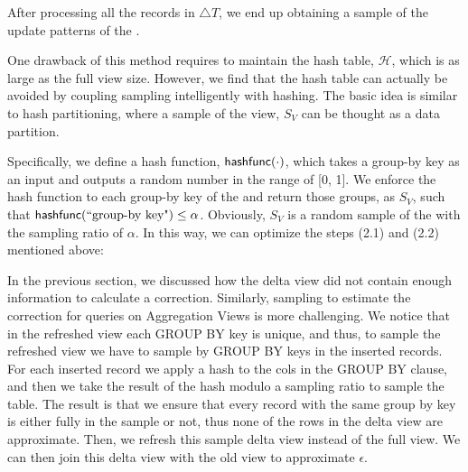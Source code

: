 After processing all the records in $\triangle T$, we end up obtaining a sample of the update patterns of the \aggview. 


One drawback of this method requires to maintain the hash table, $\mathcal{H}$, which is as large as the full view size. However, we find that the hash table can actually be avoided by coupling sampling intelligently with hashing. The basic idea is similar to hash partitioning, where a sample of the view, $S_{V}$ can be thought as a data partition. 

Specifically, we define a hash function, $\textsf{hashfunc}(\cdot)$, which takes a group-by key as an input and outputs a random number in the range of [0, 1]. We enforce the hash function to each group-by key of the \aggview and return those groups, as $S_{V}$, such that $\textsf{hashfunc}(\textrm{``group-by key"}) \leq \alpha$. Obviously, $S_{V}$ is a random sample of the \aggview with the sampling ratio of $\alpha$. In this way, we can optimize the steps (2.1) and (2.2) mentioned above:

{\noindent {}}


\fi






\iffalse
In the previous section, we discussed how the delta view did not contain enough
information to calculate a correction.
Similarly, sampling to estimate the correction for queries on Aggregation Views
is more challenging.
We notice that in the refreshed view each GROUP BY key is unique, and
thus, to sample the refreshed view we have to sample by GROUP BY keys
in the inserted records. For each inserted record we apply a hash
to the cols in the GROUP BY clause, and then we take the result of
the hash modulo a sampling ratio to sample the table. The result is
that we ensure that every record with the same group by key is either
fully in the sample or not, thus none of the rows in the delta view
are approximate. 
Then, we refresh this sample delta view instead of the full view.
We can then join this delta view with the old view to approximate $\epsilon$.

